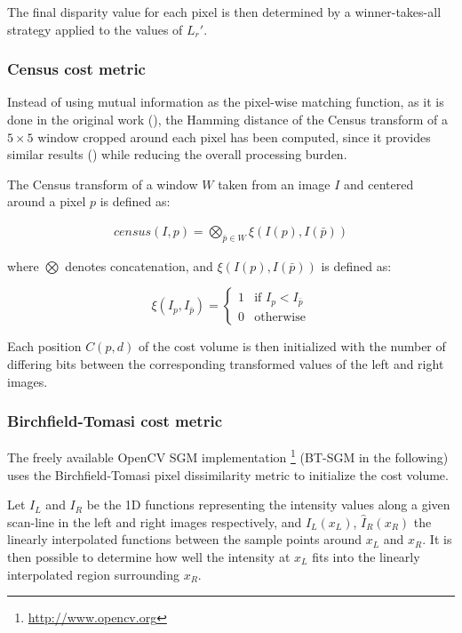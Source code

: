 The final disparity value for each pixel is then determined by a winner-takes-all strategy applied to the values of $L_r'$.

\subsubsection{Census cost metric}\label{ch:chapter03_03_01_01}

Instead of using mutual information as the pixel-wise matching function, as it is done in the original work (\cite{Hirschmuller2005}), the Hamming distance of the Census transform of a $5 \times 5$ window cropped around each pixel has been computed, since it provides similar results (\cite{Hirschmuller2009}) while reducing the overall processing burden.

The Census transform of a window $W$ taken from an image $I$ and centered around a pixel $p$ is defined as:

\begin{align}\label{eq:cp03_census_transform}
census(I, p) = \underset{\bar{p} \in W}{\bigotimes} \xi(I(p), I(\bar{p}))
\end{align}

where $\bigotimes$ denotes concatenation, and $\xi(I(p), I(\bar{p}))$ is defined as:

\begin{equation}\label{eq:cp03_census_xi}
\xi(I_p, I_{\bar{p}}) = \left\{ \begin{array}{ll}
         1 & \text{if~} I_p < I_{\bar{p}}\\
         0 & \text{otherwise}
         \end{array} \right.
\end{equation}

Each position $C(p, d)$ of the cost volume is then initialized with the number of differing bits between the corresponding transformed values of the left and right images.

\subsubsection{Birchfield-Tomasi cost metric}\label{ch:chapter03_03_01_02}

The freely available OpenCV SGM implementation \footnote{\url{http://www.opencv.org}} (BT-SGM in the following) uses the Birchfield-Tomasi pixel dissimilarity metric \citep{Birchfield1998} to initialize the cost volume.

Let $I_L$ and $I_R$ be the 1D functions representing the intensity values along a given scan-line in the left and right images respectively, and $\hat{I}_L(x_L)$, $\hat{I}_R(x_R)$ the linearly interpolated functions between the sample points around $x_L$ and $x_R$. It is then possible to determine how well the intensity at $x_L$ fits into the linearly interpolated region surrounding $x_R$.

